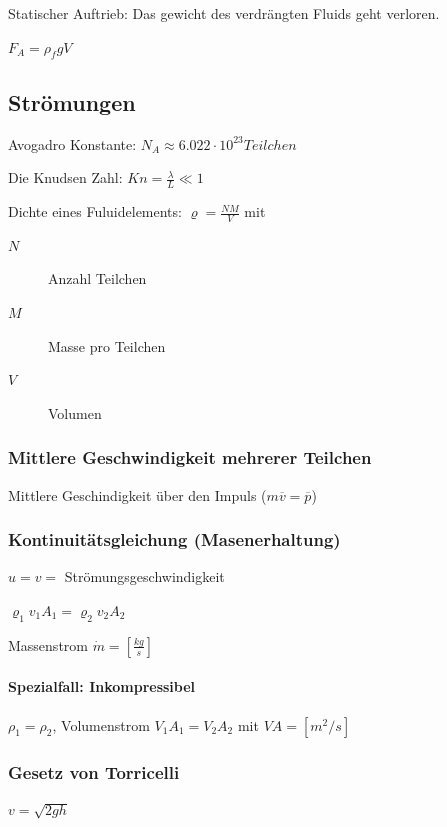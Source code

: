 \documentclass[a4paper]{scrartcl}
\begin{document}
Statischer Auftrieb: Das gewicht des verdrängten Fluids geht verloren.

$F_A = \rho_f g V$

\subsection{Strömungen}

Avogadro Konstante: $N_A \approx 6.022 \cdot 10^23 Teilchen$

Die Knudsen Zahl: $Kn = \frac{\lambda}{L} \ll 1$

Dichte eines Fuluidelements: $\varrho = \frac{NM}{V}$ mit
\begin{description}
	\item[$N$] Anzahl Teilchen
	\item[$M$] Masse pro Teilchen 
	\item[$V$] Volumen
\end{description}

\subsubsection{Mittlere Geschwindigkeit mehrerer Teilchen}

Mittlere Geschindigkeit über den Impuls ($m\overline{v} = \overline{p}$)


\subsubsection{Kontinuitätsgleichung (Masenerhaltung)}


$u = v = $ Strömungsgeschwindigkeit 

$\varrho_1 v_1 A_1 = \varrho_2 v_2 A_2$

Massenstrom $\dot{m} = \left[ \frac{kg}{s} \right]$

\paragraph{Spezialfall: Inkompressibel} $\rho_1 = \rho_2$, Volumenstrom $V_1 A_1 = V_2 A_2$ mit $VA = \left[ m^2/s \right]$


\subsubsection{Gesetz von Torricelli}

$v = \sqrt{2gh}$
\end{document}

